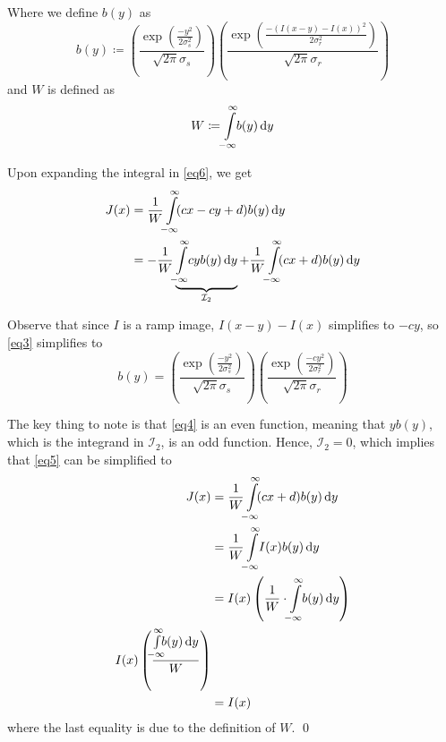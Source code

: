 \documentclass[a4paper]{article}
\begin{document}
\begin{enumerate}
Where we define $b(y)$ as
\begin{equation}
b(y) \coloneqq \left ( \dfrac{\exp\left (\frac{-y^2}{2\sigma_s^2}\right )}{\sqrt{2\pi}\sigma_s} \right ) \left ( \dfrac{\exp\left (\frac{-(I(x - y) - I(x))^2}{2\sigma_r^2}\right )}{\sqrt{2\pi}\sigma_r} \right )
\label{eq3}
\end{equation}
and $W$ is defined as
\begin{equation*}
W \coloneqq \int\limits_{\mathclap{-\infty}}^{\mathclap{\infty}}\! b(y)\, \mathrm{d}y
\end{equation*}

Upon expanding the integral in \eqref{eq6}, we get
\begin{align}
J(x) &= \dfrac{1}{W}\int\limits_{\mathclap{-\infty}}^{\mathclap{\infty}}\! (cx - cy + d) b(y)\, \mathrm{d}y \nonumber \\
&= -\dfrac{1}{W}\underbrace{\int\limits_{\mathclap{-\infty}}^{\mathclap{\infty}}\! cy b(y)\, \mathrm{d}y}_{\mathcal{I}_2} + \dfrac{1}{W}\int\limits_{\mathclap{-\infty}}^{\mathclap{\infty}}\! (cx + d) b(y)\, \mathrm{d}y
\label{eq5}
\end{align}

Observe that since $I$ is a ramp image, $I(x - y) - I(x)$ simplifies to $-cy$, so \eqref{eq3} simplifies to
\begin{equation}
b(y) = \left ( \dfrac{\exp\left (\frac{-y^2}{2\sigma_s^2}\right )}{\sqrt{2\pi}\sigma_s} \right ) \left ( \dfrac{\exp\left (\frac{-cy^2}{2\sigma_r^2}\right )}{\sqrt{2\pi}\sigma_r} \right )
\label{eq4}
\end{equation}

The key thing to note is that \eqref{eq4} is an even function, meaning that $y b(y)$, which is the integrand in $\mathcal{I}_2$, is an odd function. Hence, $\mathcal{I}_2 = 0$, which implies that \eqref{eq5} can be simplified to
\begin{align*}
J(x) &= \dfrac{1}{W}\int\limits_{\mathclap{-\infty}}^{\mathclap{\infty}}\! (cx + d) b(y)\, \mathrm{d}y \\
&= \dfrac{1}{W}\int\limits_{\mathclap{-\infty}}^{\mathclap{\infty}}\! I(x) b(y)\, \mathrm{d}y \\
&= I(x) \left (\dfrac{1}{W}\cdot \int\limits_{\mathclap{-\infty}}^{\mathclap{\infty}}\! b(y)\, \mathrm{d}y \right ) \\
I(x) \left (\dfrac{\int\limits_{\mathclap{-\infty}}^{\mathclap{\infty}}\! b(y)\, \mathrm{d}y}{W}\right ) \\
&= I(x)
\end{align*}
where the last equality is due to the definition of $W$. \qed
\end{enumerate}
\end{document}
